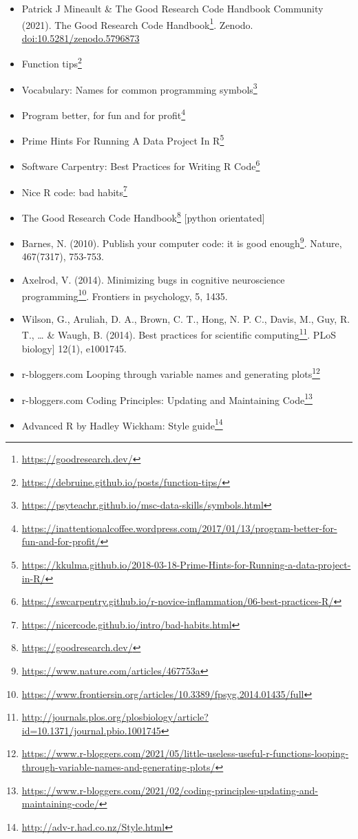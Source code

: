 \documentclass[
  12pt,
  a5paper,
]{book}
\DeclareRobustCommand{\href}[2]{#2\footnote{\url{#1}}}
\providecommand{\tightlist}{%
  \setlength{\itemsep}{0pt}\setlength{\parskip}{0pt}}
\begin{document}
\begin{itemize}
\tightlist
\item
  Patrick J Mineault \& The Good Research Code Handbook Community (2021). \href{https://goodresearch.dev/}{The Good Research Code Handbook}. Zenodo. \url{doi:10.5281/zenodo.5796873}
\item
  \href{https://debruine.github.io/posts/function-tips/}{Function tips}
\item
  Vocabulary: \href{https://psyteachr.github.io/msc-data-skills/symbols.html}{Names for common programming symbols}
\item
  \href{https://inattentionalcoffee.wordpress.com/2017/01/13/program-better-for-fun-and-for-profit/}{Program better, for fun and for profit}
\item
  \href{https://kkulma.github.io/2018-03-18-Prime-Hints-for-Running-a-data-project-in-R/}{Prime Hints For Running A Data Project In R}
\item
  Software Carpentry: \href{https://swcarpentry.github.io/r-novice-inflammation/06-best-practices-R/}{Best Practices for Writing R Code}
\item
  Nice R code: \href{https://nicercode.github.io/intro/bad-habits.html}{bad habits}
\item
  \href{https://goodresearch.dev/}{The Good Research Code Handbook} {[}python orientated{]}
\item
  Barnes, N. (2010). \href{https://www.nature.com/articles/467753a}{Publish your computer code: it is good enough}. Nature, 467(7317), 753-753.
\item
  Axelrod, V. (2014). \href{https://www.frontiersin.org/articles/10.3389/fpsyg.2014.01435/full}{Minimizing bugs in cognitive neuroscience programming}. Frontiers in psychology, 5, 1435.
\item
  Wilson, G., Aruliah, D. A., Brown, C. T., Hong, N. P. C., Davis, M., Guy, R. T., \ldots{} \& Waugh, B. (2014). \href{http://journals.plos.org/plosbiology/article?id=10.1371/journal.pbio.1001745}{Best practices for scientific computing}. PLoS biology{]} 12(1), e1001745.
\item
  r-bloggers.com \href{https://www.r-bloggers.com/2021/05/little-useless-useful-r-functions-looping-through-variable-names-and-generating-plots/}{Looping through variable names and generating plots}
\item
  r-bloggers.com \href{https://www.r-bloggers.com/2021/02/coding-principles-updating-and-maintaining-code/}{Coding Principles: Updating and Maintaining Code}
\item
  Advanced R by Hadley Wickham: \href{http://adv-r.had.co.nz/Style.html}{Style guide}
\end{itemize}
\end{document}
